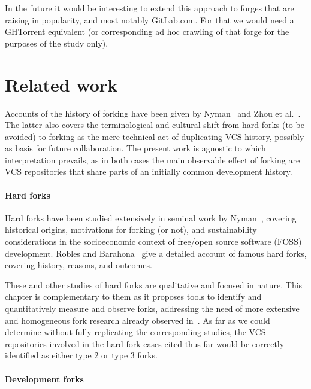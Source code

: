 In the future it would be interesting to extend this approach to forges that
are raising in popularity, and most notably GitLab.com. For that we would need
a GHTorrent equivalent (or corresponding ad hoc crawling of that forge for the
purposes of the study only).


\section{Related work}%
\label{sec:forks-related}

Accounts of the history of forking have been given by
Nyman~\cite{nyman2016forkhistory} and Zhou et al.~\cite[Section
2]{zhou2019fork}. The latter also covers the terminological and cultural shift
from hard forks (to be avoided) to forking as the mere technical act of
duplicating VCS history, possibly as basis for future collaboration. The
present work is agnostic to which interpretation prevails, as in both cases the
main observable effect of forking are VCS repositories that share parts of an
initially common development history.


\paragraph{Hard forks}

Hard forks have been studied extensively in seminal work by
Nyman~\cite{nyman2011-fork-or-not, nyman2012forking-sustainability,
  nyman2014forking-hackers, nyman2016forkhistory}, covering historical origins,
motivations for forking (or not), and sustainability considerations in the
socioeconomic context of free/open source software (FOSS) development.  Robles
and Barahona~\cite{robles2012forks} give a detailed account of famous hard
forks, covering history, reasons, and outcomes.

These and other studies of hard forks are qualitative and focused in nature.
  This chapter is complementary to
them as it proposes tools to identify and quantitatively measure and observe
forks, addressing the need of more extensive and homogeneous fork research
already observed in~\cite{robles2012forks}. As far as we could determine
without fully replicating the corresponding studies, the VCS repositories
involved in the hard fork cases cited thus far would be correctly identified as
either type 2 or type 3 forks.


\paragraph{Development forks}

